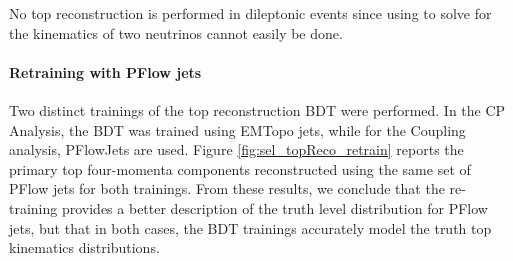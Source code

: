 No top reconstruction is performed in dileptonic events since using \MET to solve for the kinematics of two neutrinos cannot easily be done.

\paragraph{Retraining with PFlow jets}
Two distinct trainings of the top reconstruction BDT were performed. In the CP Analysis, the BDT was trained using EMTopo jets, while for the Coupling analysis, PFlowJets are used. Figure \ref{fig:sel_topReco_retrain} reports the primary top four-momenta components reconstructed using the same set of PFlow jets for both trainings. From these results, we conclude that the re-training provides a better description of the truth level distribution for PFlow jets, but that in both cases, the BDT trainings accurately model the truth top kinematics distributions.

